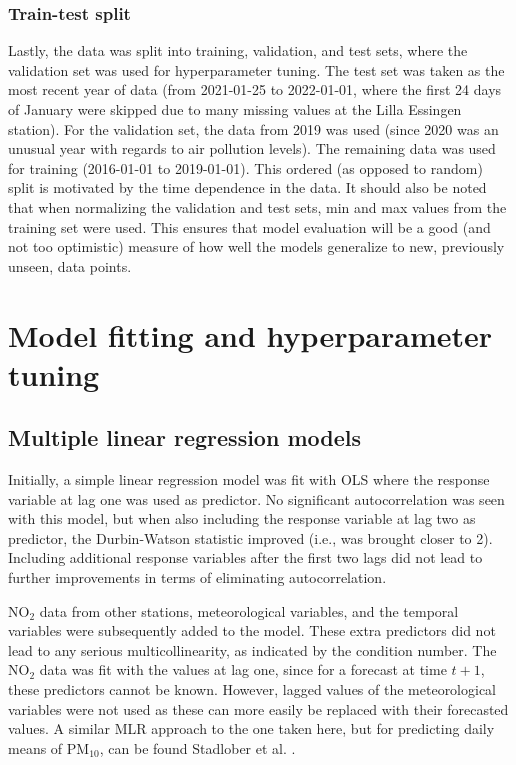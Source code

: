 \subsubsection{Train-test split} 
Lastly, the data was split into training, validation, and test sets, where the validation set was used for hyperparameter tuning. The test set was taken as the most recent year of data (from 2021-01-25 to 2022-01-01, where the first 24 days of January were skipped due to many missing values at the Lilla Essingen station). For the validation set, the data from 2019 was used (since 2020 was an unusual year with regards to air pollution levels). The remaining data was used for training (2016-01-01 to 2019-01-01). This ordered (as opposed to random) split is motivated by the time dependence in the data. It should also be noted that when normalizing the validation and test sets, min and max values from the training set were used. This ensures that model evaluation will be a good (and not too optimistic) measure of how well the models generalize to new, previously unseen, data points.

\section{Model fitting and hyperparameter tuning}
\label{sec:model_fitting_hp_tuning}

\subsection{Multiple linear regression models}
Initially, a simple linear regression model was fit with OLS where the response variable at lag one was used as predictor. No significant autocorrelation was seen with this model, but when also including the response variable at lag two as predictor, the Durbin-Watson statistic improved (i.e., was brought closer to 2). Including additional response variables after the first two lags did not lead to further improvements in terms of eliminating autocorrelation.

NO$_2$ data from other stations, meteorological variables, and the temporal variables were subsequently added to the model. These extra predictors did not lead to any serious multicollinearity, as indicated by the condition number. The NO$_2$ data was fit with the values at lag one, since for a forecast at time $t+1$, these predictors cannot be known. However, lagged values of the meteorological variables were not used as these can more easily be replaced with their forecasted values. A similar MLR approach to the one taken here, but for predicting daily means of PM$_{10}$, can be found Stadlober et al. \cite{Stadlober2008}. 

